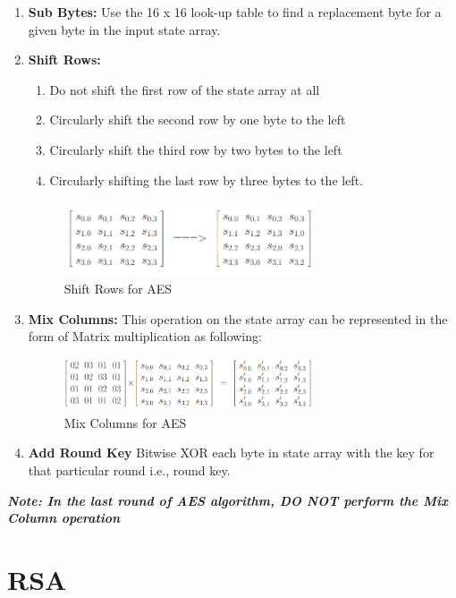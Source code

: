 \documentclass[a4paper]{report} %
\begin{document}
\begin{enumerate}
    \item \textbf{Sub Bytes:} Use the 16 x 16 look-up table to find a replacement byte for a given byte in the input state array. 
    \item \textbf{Shift Rows:}
    \begin{enumerate}
        \item Do not shift the first row of the state array at all
        \item Circularly shift the second row by one byte to the left
        \item Circularly shift the third row by two bytes to the left
        \item Circularly shifting the last row by three bytes to the left.
 
    \end{enumerate}
    \begin{figure}[ht]
    \centering
    \includegraphics[width=0.7\textwidth]{images/ShiftRows_AES.PNG}
    \caption{Shift Rows for AES}
    \end{figure}
    
    \item \textbf{Mix Columns:} 
    This operation on the state array can be represented in the form of Matrix multiplication as following: 
    
    \begin{figure}[ht]
    \centering
    \includegraphics[width=0.7\textwidth]{images/MixColumns_AES.PNG}
    \caption{Mix Columns for AES}
    \end{figure}
    \item \textbf{Add Round Key} Bitwise XOR each byte in state array with the key for that particular round i.e., round key. 
\end{enumerate}
\emph{\textbf{Note: In the last round of AES algorithm, DO NOT perform the Mix Column operation}}
\section{RSA}
\end{document}
